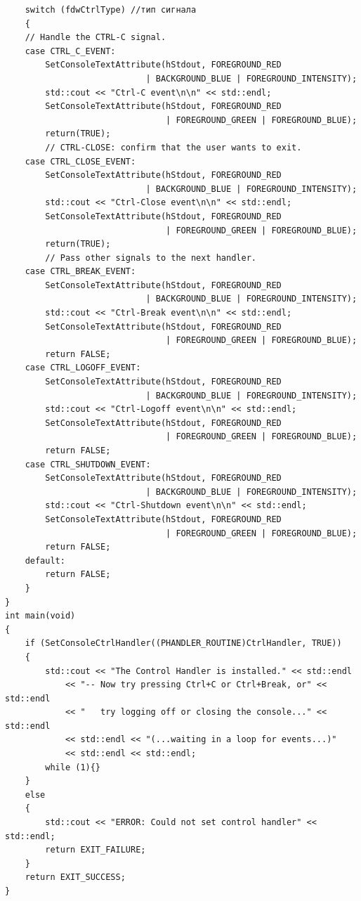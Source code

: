 \documentclass[a4paper,12pt]{article} %
\begin{document}
\begin{verbatim}
    switch (fdwCtrlType) //тип сигнала
    {
    // Handle the CTRL-C signal.
    case CTRL_C_EVENT:
        SetConsoleTextAttribute(hStdout, FOREGROUND_RED 
                            | BACKGROUND_BLUE | FOREGROUND_INTENSITY);
        std::cout << "Ctrl-C event\n\n" << std::endl;
        SetConsoleTextAttribute(hStdout, FOREGROUND_RED 
                                | FOREGROUND_GREEN | FOREGROUND_BLUE);
        return(TRUE);
        // CTRL-CLOSE: confirm that the user wants to exit.
    case CTRL_CLOSE_EVENT:
        SetConsoleTextAttribute(hStdout, FOREGROUND_RED
                            | BACKGROUND_BLUE | FOREGROUND_INTENSITY);
        std::cout << "Ctrl-Close event\n\n" << std::endl;
        SetConsoleTextAttribute(hStdout, FOREGROUND_RED
                                | FOREGROUND_GREEN | FOREGROUND_BLUE);
        return(TRUE);
        // Pass other signals to the next handler.
    case CTRL_BREAK_EVENT:
        SetConsoleTextAttribute(hStdout, FOREGROUND_RED
                            | BACKGROUND_BLUE | FOREGROUND_INTENSITY);
        std::cout << "Ctrl-Break event\n\n" << std::endl;
        SetConsoleTextAttribute(hStdout, FOREGROUND_RED 
                                | FOREGROUND_GREEN | FOREGROUND_BLUE);
        return FALSE;
    case CTRL_LOGOFF_EVENT:
        SetConsoleTextAttribute(hStdout, FOREGROUND_RED 
                            | BACKGROUND_BLUE | FOREGROUND_INTENSITY);
        std::cout << "Ctrl-Logoff event\n\n" << std::endl;
        SetConsoleTextAttribute(hStdout, FOREGROUND_RED 
                                | FOREGROUND_GREEN | FOREGROUND_BLUE);
        return FALSE;
    case CTRL_SHUTDOWN_EVENT:
        SetConsoleTextAttribute(hStdout, FOREGROUND_RED 
                            | BACKGROUND_BLUE | FOREGROUND_INTENSITY);
        std::cout << "Ctrl-Shutdown event\n\n" << std::endl;
        SetConsoleTextAttribute(hStdout, FOREGROUND_RED 
                                | FOREGROUND_GREEN | FOREGROUND_BLUE);
        return FALSE;
    default:
        return FALSE;
    }
}
int main(void)
{
    if (SetConsoleCtrlHandler((PHANDLER_ROUTINE)CtrlHandler, TRUE))
    {
        std::cout << "The Control Handler is installed." << std::endl
            << "-- Now try pressing Ctrl+C or Ctrl+Break, or" << std::endl
            << "   try logging off or closing the console..." << std::endl
            << std::endl << "(...waiting in a loop for events...)"
            << std::endl << std::endl;
        while (1){}
    }
    else
    {
        std::cout << "ERROR: Could not set control handler" << std::endl;
        return EXIT_FAILURE;
    }
    return EXIT_SUCCESS;
}
\end{verbatim}
\end{document}
